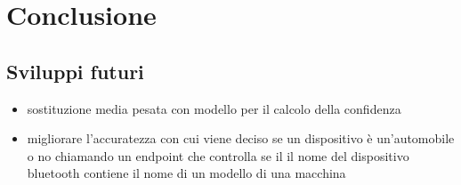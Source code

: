 \chapter{Conclusione}
\section{Sviluppi futuri}
\begin{itemize}
    \item sostituzione media pesata con modello per il calcolo della confidenza
    \item migliorare l'accuratezza con cui viene deciso se un dispositivo è un'automobile o no chiamando un endpoint che controlla se il il nome del dispositivo bluetooth contiene il nome di un modello di una macchina
\end{itemize}